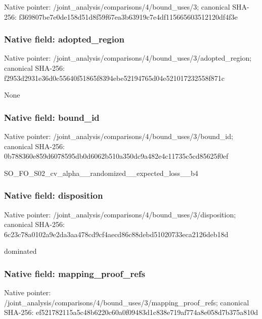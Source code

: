 \documentclass[10pt,a4paper]{article}
\begin{document}
Native pointer: /joint\_analysis/comparis\allowbreak{}ons/4/bound\_uses/3; canonical SHA-256: f369807be7e0de158d51d8f5\allowbreak{}9f67ea3b63919c7e4df11566\allowbreak{}5603512120df4f3e



\subsubsection{Native field: adopted\_region}


Native pointer: /joint\_analysis/comparis\allowbreak{}ons/4/bound\_uses/3/adopt\allowbreak{}ed\_region; canonical SHA-256: f2953d2931e36d0c55640f51\allowbreak{}865f8394ebe52194765d04e5\allowbreak{}21017232558f871c


None


\subsubsection{Native field: bound\_id}


Native pointer: /joint\_analysis/comparis\allowbreak{}ons/4/bound\_uses/3/bound\allowbreak{}\_id; canonical SHA-256: 0b788360e859d6078595db0d\allowbreak{}6062b510a350dc9a482e4c11\allowbreak{}735c5cd85625f0ef


SO\_FO\_S02\_cv\_alpha\_\_rand\allowbreak{}omized\_\_expected\_loss\_\_b\allowbreak{}4


\subsubsection{Native field: disposition}


Native pointer: /joint\_analysis/comparis\allowbreak{}ons/4/bound\_uses/3/dispo\allowbreak{}sition; canonical SHA-256: 6c23c78a0102a9e2da3aa478\allowbreak{}cd9cf4aecd86c88debd51020\allowbreak{}733eca2126deb18d


dominated


\subsubsection{Native field: mapping\_proof\_refs}


Native pointer: /joint\_analysis/comparis\allowbreak{}ons/4/bound\_uses/3/mappi\allowbreak{}ng\_proof\_refs; canonical SHA-256: ef521782115a5c48b6220c60\allowbreak{}a0f09483d1c838e719af774a\allowbreak{}8e058d7b375a810d
\end{document}
